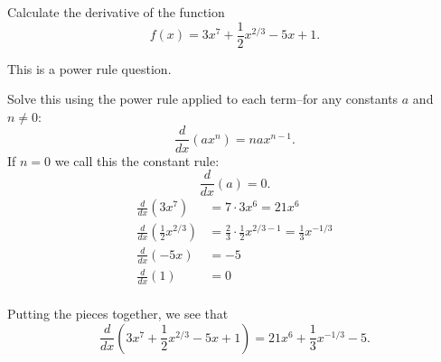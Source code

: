 \documentclass{ximera}
\author{Emma Smith Zbarsky}
\begin{document}
\begin{exercise}

Calculate the derivative of the function
\[f(x) = 3x^7+\frac{1}{2}x^{2/3}-5x+1.\]


\begin{hint}
This is a power rule question.
\end{hint}


\begin{hint}
Solve this using the power rule applied to each term--for any constants
$a$ and $n \neq 0$: \[\frac{d}{dx}\left(ax^n\right) = nax^{n-1}.\] If
$n=0$ we call this the constant rule:\[\frac{d}{dx}\left(a\right) = 0.\]
\begin{align*}
\frac{d}{dx}(3x^7) &= 7\cdot 3x^6 = 21x^6 \\
\frac{d}{dx}\left(\frac{1}{2}x^{2/3}\right) &= \frac{2}{3}\cdot \frac{1}{2}x^{2/3-1} = \frac{1}{3}x^{-1/3} \\
\frac{d}{dx}(-5x) &= -5 \\
\frac{d}{dx}(1) &= 0 \\
\end{align*}

Putting the pieces together, we see that
\[\frac{d}{dx}\left(3x^7+\frac{1}{2}x^{2/3}-5x+1\right) = \boxed{21x^6+\frac{1}{3}x^{-1/3}-5}.\]
\end{hint}


\begin{multipleChoice}
\end{multipleChoice}

\end{exercise}
\end{document}
